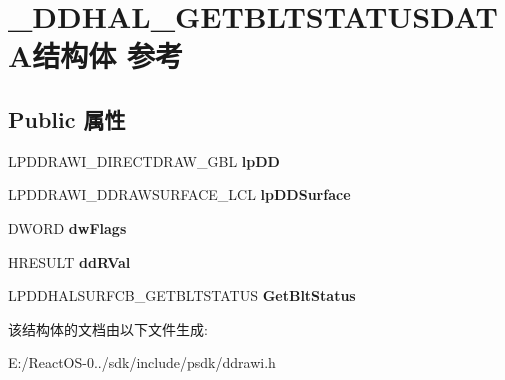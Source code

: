 \hypertarget{struct___d_d_h_a_l___g_e_t_b_l_t_s_t_a_t_u_s_d_a_t_a}{}\section{\+\_\+\+D\+D\+H\+A\+L\+\_\+\+G\+E\+T\+B\+L\+T\+S\+T\+A\+T\+U\+S\+D\+A\+T\+A结构体 参考}
\label{struct___d_d_h_a_l___g_e_t_b_l_t_s_t_a_t_u_s_d_a_t_a}
\subsection*{Public 属性}
\begin{DoxyCompactItemize}
\item 
\mbox{\label{struct___d_d_h_a_l___g_e_t_b_l_t_s_t_a_t_u_s_d_a_t_a_add3815ff82ff7a0d5c4aa29470ce0601}} 
L\+P\+D\+D\+R\+A\+W\+I\+\_\+\+D\+I\+R\+E\+C\+T\+D\+R\+A\+W\+\_\+\+G\+BL {\bfseries lp\+DD}
\item 
\mbox{\label{struct___d_d_h_a_l___g_e_t_b_l_t_s_t_a_t_u_s_d_a_t_a_a8f9851487148e449d2847f4dfdf233eb}} 
L\+P\+D\+D\+R\+A\+W\+I\+\_\+\+D\+D\+R\+A\+W\+S\+U\+R\+F\+A\+C\+E\+\_\+\+L\+CL {\bfseries lp\+D\+D\+Surface}
\item 
\mbox{\label{struct___d_d_h_a_l___g_e_t_b_l_t_s_t_a_t_u_s_d_a_t_a_ac202bda1dc612c1528e4dcff904ada46}} 
D\+W\+O\+RD {\bfseries dw\+Flags}
\item 
\mbox{\label{struct___d_d_h_a_l___g_e_t_b_l_t_s_t_a_t_u_s_d_a_t_a_a429dc6e708ea8b2fd4492210bfd87347}} 
H\+R\+E\+S\+U\+LT {\bfseries dd\+R\+Val}
\item 
\mbox{\label{struct___d_d_h_a_l___g_e_t_b_l_t_s_t_a_t_u_s_d_a_t_a_a4aa0d7e1516045f8f9f414b62a895740}} 
L\+P\+D\+D\+H\+A\+L\+S\+U\+R\+F\+C\+B\+\_\+\+G\+E\+T\+B\+L\+T\+S\+T\+A\+T\+US {\bfseries Get\+Blt\+Status}
\end{DoxyCompactItemize}


该结构体的文档由以下文件生成\+:\begin{DoxyCompactItemize}
\item 
E\+:/\+React\+O\+S-\/0../sdk/include/psdk/ddrawi.\+h\end{DoxyCompactItemize}
